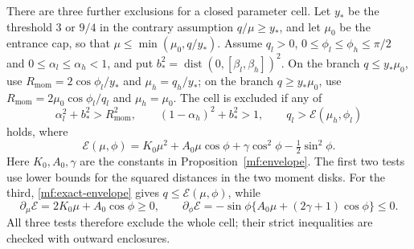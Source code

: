 There are three further exclusions for a closed parameter cell.
Let $y_*$ be the threshold $3$ or $9/4$ in the contrary assumption
$q/\mu\ge y_*$, and let $\mu_0$ be the entrance cap, so that
$\mu\le\min(\mu_0,q/y_*)$.
Assume $q_l>0$, $0\le\phi_l\le\phi_h\le\pi/2$ and
$0\le\alpha_l\le\alpha_h<1$, and put
$b_*^2=\operatorname{dist}(0,[\beta_l,\beta_h])^2$.
On the branch $q\le y_*\mu_0$, use
$R_{\mathrm{mom}}=2\cos\phi_l/y_*$ and $\mu_h=q_h/y_*$;
on the branch $q\ge y_*\mu_0$, use
$R_{\mathrm{mom}}=2\mu_0\cos\phi_l/q_l$ and $\mu_h=\mu_0$.
The cell is excluded if any of
\begin{equation}\label{mf:cell-exclusions}
 \alpha_l^2+b_*^2>R_{\mathrm{mom}}^2,\qquad
 (1-\alpha_h)^2+b_*^2>1,\qquad
 q_l>\mathcal E(\mu_h,\phi_l)
\end{equation}
holds, where
\[
 \mathcal E(\mu,\phi)
 =K_0\mu^2+A_0\mu\cos\phi
       +\gamma\cos^2\phi-\tfrac12\sin^2\phi.
\]
Here $K_0,A_0,\gamma$ are the constants in Proposition~\ref{mf:envelope}.
The first two tests use lower bounds for the squared distances in
the two moment disks. For the third, \eqref{mf:exact-envelope} gives
$q\le\mathcal E(\mu,\phi)$, while
\[
 \partial_\mu\mathcal E=2K_0\mu+A_0\cos\phi\ge0,\qquad
 \partial_\phi\mathcal E
 =-\sin\phi\{A_0\mu+(2\gamma+1)\cos\phi\}\le0.
\]
All three tests therefore exclude the whole cell; their strict
inequalities are checked with outward enclosures.

